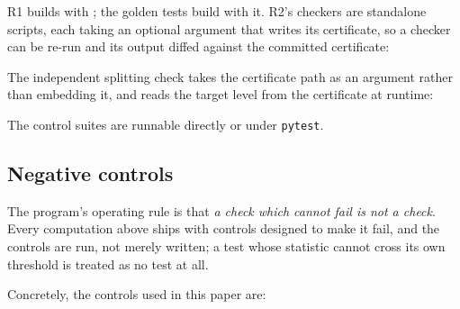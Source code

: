 R1 builds with ; the golden tests build with it. R2's
checkers are standalone scripts, each taking an optional 
argument that writes its certificate, so a checker can be re-run and its output
diffed against the committed certificate:
\begin{center}\small
{}
\end{center}
The independent splitting check takes the certificate path as an argument
rather than embedding it, and reads the target level from the certificate at
runtime:
\begin{center}\small
{}
\end{center}
The control suites are runnable directly or under \texttt{pytest}.

\subsection{Negative controls}

The program's operating rule is that \emph{a check which cannot fail is not a
check}. Every computation above ships with controls designed to make it fail,
and the controls are run, not merely written; a test whose statistic cannot
cross its own threshold is treated as no test at all.

Concretely, the controls used in this paper are:

